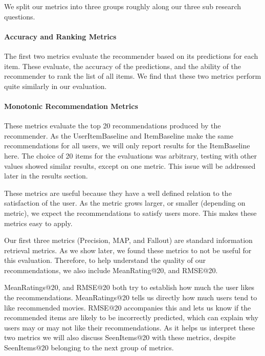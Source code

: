 \documentclass[letterpaper]{sig-alternate}
\begin{document}
  \addtocounter{footnote}{1}

  We split our metrics into three groups roughly along our three sub research questions.
  
  \paragraph{Accuracy and Ranking Metrics}
  The first two metrics evaluate the recommender based on its predictions for each item.
  These evaluate, the accuracy of the predictions, and the ability of the recommender to rank the list of all items.
  We find that these two metrics perform quite similarly in our evaluation.

  \paragraph{Monotonic Recommendation Metrics}
  These metrics evaluate the top 20 recommendations produced by the recommender.
  As the UserItemBaseline and ItemBaseline make the same recommendations for all users, we will only report results for the ItemBaseline here.
  The choice of 20 items for the evaluations was arbitrary, testing with other values showed similar results, except on one metric.
  This issue will be addressed later in the results section.
  
  These metrics are useful because they have a well defined relation to the satisfaction of the user.
  As the metric grows larger, or smaller (depending on metric), we expect the recommendations to satisfy users more.
  This makes these metrics easy to apply.

  Our first three metrics (Precision, MAP, and Fallout) are standard information retrieval metrics.
  As we show later, we found these metrics to not be useful for this evaluation.
  Therefore, to help understand the quality of our recommendations, we also include MeanRating@20, and RMSE@20.

  MeanRatings@20, and RMSE@20 both try to establish how much the user likes the recommendations.
  MeanRatings@20 tells us directly how much users tend to like recommended movies.
  RMSE@20 accompanies this and lets us know if the recommended items are likely to be incorrectly predicted, which can explain why users may or may not like their recommendations.
  As it helps us interpret these two metrics we will also discuss SeenItems@20 with these metrics, despite SeenItems@20 belonging to the next group of metrics.
\end{document}
